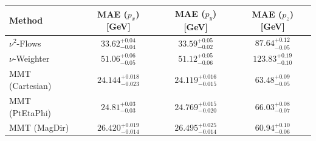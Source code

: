     \begin{tabular}{lccc}
        \toprule
        Method & MAE ($p_x$) [GeV] & MAE ($p_y$) [GeV] & MAE ($p_z$) [GeV] \\
        \midrule
        $\nu^2$-Flows & $33.62^{+0.04}_{-0.04}$ & $33.59^{+0.05}_{-0.02}$ & $87.64^{+0.12}_{-0.05}$ \\
        $\nu$-Weighter & $51.06^{+0.06}_{-0.05}$ & $51.12^{+0.05}_{-0.06}$ & $123.83^{+0.19}_{-0.10}$ \\
        MMT (Cartesian) & $24.144^{+0.018}_{-0.023}$ & $24.119^{+0.016}_{-0.015}$ & $63.48^{+0.09}_{-0.05}$ \\
        MMT (PtEtaPhi) & $24.81^{+0.03}_{-0.03}$ & $24.769^{+0.015}_{-0.020}$ & $66.03^{+0.08}_{-0.07}$ \\
        MMT (MagDir) & $26.420^{+0.019}_{-0.014}$ & $26.495^{+0.025}_{-0.014}$ & $60.94^{+0.10}_{-0.06}$ \\
        \bottomrule
    \end{tabular}